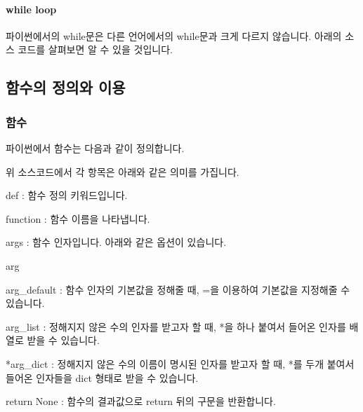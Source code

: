 \documentclass[twoside]{article}
\begin{document}



\paragraph{while loop} 파이썬에서의 while문은 다른 언어에서의 while문과 크게 다르지 않습니다. 아래의 소스 코드를 살펴보면 알 수 있을 것입니다. 



                
                
\subsection{함수의 정의와 이용}

\subsubsection{함수}

파이썬에서 함수는 다음과 같이 정의합니다. 



                
위 소스코드에서 각 항목은 아래와 같은 의미를 가집니다. 

\begin{compactitem} 
\item def : 함수 정의 키워드입니다. 
\item function : 함수 이름을 나타냅니다. 
\item args : 함수 인자입니다. 아래와 같은 옵션이 있습니다. 
\begin{compactitem} 
\item arg 
\item arg\_default : 함수 인자의 기본값을 정해줄 때, =을 이용하여 기본값을 지정해줄 수 있습니다. 
\item *arg\_list : 정해지지 않은 수의 인자를 받고자 할 때, *을 하나 붙여서 들어온 인자를 배열로 받을 수 있습니다. 
\item **arg\_dict : 정해지지 않은 수의 이름이 명시된 인자를 받고자 할 때, *를 두개 붙여서 들어온 인자들을 dict 형태로 받을 수 있습니다. 
\end{compactitem} 
\item return None : 함수의 결과값으로 return 뒤의 구문을 반환합니다. 
\end{compactitem}
\end{document}
